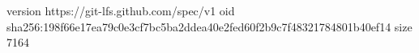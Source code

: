 version https://git-lfs.github.com/spec/v1
oid sha256:198f66e17ea79c0e3cf7bc5ba2ddea40e2fed60f2b9c7f48321784801b40ef14
size 7164
